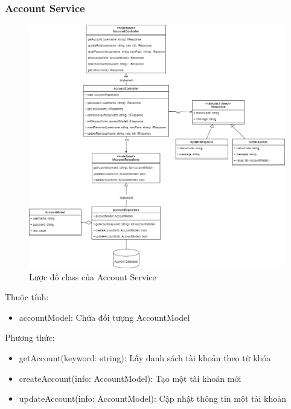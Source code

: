 \subsubsection{Account Service}
\begin{figure}[!htp]
	\centering
	\includegraphics[width=14cm]{img/Architecture/service/AccountService.png}
	\newline
	\caption{Lược đồ class của Account Service}
\end{figure}

Thuộc tính:
\begin{itemize}
	\item accountModel: Chứa đối tượng AccountModel
\end{itemize}
Phương thức:
\begin{itemize}
	\item getAccount(keyword: string): Lấy danh sách tài khoản theo từ khóa
	\item createAccount(info: AccountModel): Tạo một tài khoản mới
	\item updateAccount(info: AccountModel): Cập nhật thông tin một tài khoản
\end{itemize}

